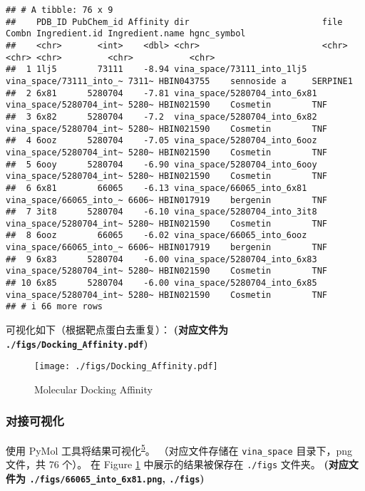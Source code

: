 \documentclass[
]{article}
\begin{document}
\begin{verbatim}
## # A tibble: 76 x 9
##    PDB_ID PubChem_id Affinity dir                          file                    Combn Ingredient.id Ingredient.name hgnc_symbol
##    <chr>       <int>    <dbl> <chr>                        <chr>                   <chr> <chr>         <chr>           <chr>      
##  1 1lj5        73111    -8.94 vina_space/73111_into_1lj5   vina_space/73111_into_~ 7311~ HBIN043755    sennoside a     SERPINE1   
##  2 6x81      5280704    -7.81 vina_space/5280704_into_6x81 vina_space/5280704_int~ 5280~ HBIN021590    Cosmetin        TNF        
##  3 6x82      5280704    -7.2  vina_space/5280704_into_6x82 vina_space/5280704_int~ 5280~ HBIN021590    Cosmetin        TNF        
##  4 6ooz      5280704    -7.05 vina_space/5280704_into_6ooz vina_space/5280704_int~ 5280~ HBIN021590    Cosmetin        TNF        
##  5 6ooy      5280704    -6.90 vina_space/5280704_into_6ooy vina_space/5280704_int~ 5280~ HBIN021590    Cosmetin        TNF        
##  6 6x81        66065    -6.13 vina_space/66065_into_6x81   vina_space/66065_into_~ 6606~ HBIN017919    bergenin        TNF        
##  7 3it8      5280704    -6.10 vina_space/5280704_into_3it8 vina_space/5280704_int~ 5280~ HBIN021590    Cosmetin        TNF        
##  8 6ooz        66065    -6.02 vina_space/66065_into_6ooz   vina_space/66065_into_~ 6606~ HBIN017919    bergenin        TNF        
##  9 6x83      5280704    -6.00 vina_space/5280704_into_6x83 vina_space/5280704_int~ 5280~ HBIN021590    Cosmetin        TNF        
## 10 6x85      5280704    -6.00 vina_space/5280704_into_6x85 vina_space/5280704_int~ 5280~ HBIN021590    Cosmetin        TNF        
## # i 66 more rows
\end{verbatim}

可视化如下（根据靶点蛋白去重复）：
\textbf{(对应文件为 \texttt{./figs/Docking\_Affinity.pdf})}

\begin{figure}
\centering
\texttt{[image: ./figs/Docking\_Affinity.pdf]}
\caption{\label{fig:fig2}Molecular Docking Affinity}
\end{figure}

\hypertarget{ux5bf9ux63a5ux53efux89c6ux5316}{%
\subsubsection{对接可视化}\label{ux5bf9ux63a5ux53efux89c6ux5316}}

使用 PyMol 工具将结果可视化\textsuperscript{\protect\hyperlink{ref-LigandDockingSeelig2010}{5}}。
（对应文件存储在 \texttt{vina\_space} 目录下，png 文件，共 76 个）。
在 Figure \ref{fig:fig2} 中展示的结果被保存在 \texttt{./figs} 文件夹。
\textbf{(对应文件为 \texttt{./figs/66065\_into\_6x81.png}, \texttt{./figs})}
\end{document}
